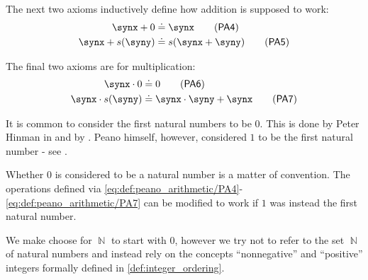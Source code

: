 \begin{definition}
  \begin{thmenum}[resume=def:peano_arithmetic]
     The next two axioms inductively define how addition is supposed to work:
    \begin{align}
      \synx + 0       &\syneq \synx           \label{eq:def:peano_arithmetic/PA4}\tag{\logic{PA4}} \\
      \synx + s(\syny) &\syneq s(\synx + \syny) \label{eq:def:peano_arithmetic/PA5}\tag{\logic{PA5}}
    \end{align}

     The final two axioms are for multiplication:
    \begin{align}
      \synx \cdot 0       &\syneq 0                    \label{eq:def:peano_arithmetic/PA6}\tag{\logic{PA6}} \\
      \synx \cdot s(\syny) &\syneq \synx \cdot \syny + \synx \label{eq:def:peano_arithmetic/PA7}\tag{\logic{PA7}}
    \end{align}
  \end{thmenum}
\end{definition}

\begin{remark}\label{rem:peano_arithmetic_zero}
  It is common to consider the first natural numbers to be \( 0 \). This is done by Peter Hinman in  and by . Peano himself, however, considered \( 1 \) to be the first natural number - see \cite[1]{Peano1889ArithmeticesPrincipia}.

  Whether \( 0 \) is considered to be a natural number is a matter of convention. The operations defined via \eqref{eq:def:peano_arithmetic/PA4}-\eqref{eq:def:peano_arithmetic/PA7} can be modified to work if \( 1 \) was instead the first natural number.

  We make choose for \( \BbbN \) to start with \( 0 \), however we try not to refer to the set \( \BbbN \) of natural numbers and instead rely on the concepts \enquote{nonnegative} and \enquote{positive} integers formally defined in \cref{def:integer_ordering}.
\end{remark}

